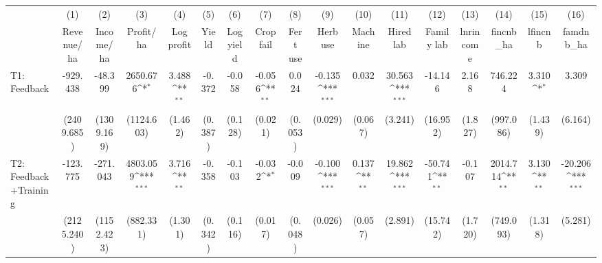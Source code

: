 {
\def\sym#1{\ifmmode^{#1}\else\(^{#1}\)\fi}
\begin{tabular}{l*{16}{c}}
\toprule
                    &\multicolumn{1}{c}{(1)}&\multicolumn{1}{c}{(2)}&\multicolumn{1}{c}{(3)}&\multicolumn{1}{c}{(4)}&\multicolumn{1}{c}{(5)}&\multicolumn{1}{c}{(6)}&\multicolumn{1}{c}{(7)}&\multicolumn{1}{c}{(8)}&\multicolumn{1}{c}{(9)}&\multicolumn{1}{c}{(10)}&\multicolumn{1}{c}{(11)}&\multicolumn{1}{c}{(12)}&\multicolumn{1}{c}{(13)}&\multicolumn{1}{c}{(14)}&\multicolumn{1}{c}{(15)}&\multicolumn{1}{c}{(16)}\\
                    &\multicolumn{1}{c}{Revenue/ha}&\multicolumn{1}{c}{Income/ha}&\multicolumn{1}{c}{Profit/ha}&\multicolumn{1}{c}{Log profit}&\multicolumn{1}{c}{Yield}&\multicolumn{1}{c}{Log yield}&\multicolumn{1}{c}{Crop fail}&\multicolumn{1}{c}{Fert use}&\multicolumn{1}{c}{Herb use}&\multicolumn{1}{c}{Machine}&\multicolumn{1}{c}{Hired lab}&\multicolumn{1}{c}{Family lab}&\multicolumn{1}{c}{lnrincome}&\multicolumn{1}{c}{fincnb\_ha}&\multicolumn{1}{c}{lfincnb}&\multicolumn{1}{c}{famdnb\_ha}\\
\midrule
T1: Feedback        &    -929.438         &     -48.399         &    2650.676\sym{*}  &       3.488\sym{**} &      -0.372         &      -0.058         &      -0.056\sym{**} &       0.024         &      -0.135\sym{***}&       0.032         &      30.563\sym{***}&     -14.146         &       2.168         &     746.224         &       3.310\sym{*}  &       3.309         \\
                    &  (2409.685)         &  (1309.169)         &  (1124.603)         &     (1.462)         &     (0.387)         &     (0.128)         &     (0.021)         &     (0.053)         &     (0.029)         &     (0.067)         &     (3.241)         &    (16.952)         &     (1.827)         &   (997.086)         &     (1.439)         &     (6.164)         \\
T2: Feedback+Training&    -123.775         &    -271.043         &    4803.059\sym{***}&       3.716\sym{**} &      -0.358         &      -0.103         &      -0.032\sym{*}  &      -0.009         &      -0.100\sym{***}&       0.137\sym{**} &      19.862\sym{***}&     -50.741\sym{**} &      -0.107         &    2014.714\sym{**} &       3.130\sym{**} &     -20.206\sym{***}\\
                    &  (2125.240)         &  (1152.423)         &   (882.331)         &     (1.301)         &     (0.342)         &     (0.116)         &     (0.017)         &     (0.048)         &     (0.026)         &     (0.057)         &     (2.891)         &    (15.742)         &     (1.720)         &   (749.093)         &     (1.318)         &     (5.281)         \\

\end{tabular}}
